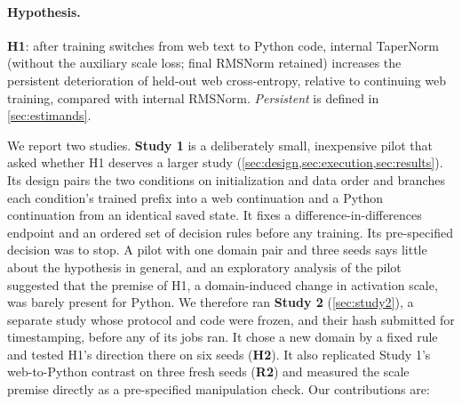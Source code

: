 \documentclass[11pt]{article}
\begin{document}
\paragraph{Hypothesis.} \textbf{H1}: after training switches from web text to Python code, internal TaperNorm
(without the auxiliary scale loss; final RMSNorm retained) increases the persistent deterioration of held-out web
cross-entropy, relative to continuing web training, compared with internal RMSNorm. \emph{Persistent} is defined
in \cref{sec:estimands}.

We report two studies. \textbf{Study 1} is a deliberately small, inexpensive pilot that asked whether H1
deserves a larger study (\cref{sec:design,sec:execution,sec:results}). Its design pairs the two conditions on
initialization and data order and branches each condition's trained prefix into a web continuation and a Python
continuation from an identical saved state. It fixes a difference-in-differences endpoint and an ordered set of
decision rules before any training. Its pre-specified decision was to stop. A pilot with one domain pair and
three seeds says little about the hypothesis in general, and an exploratory analysis of the pilot suggested that
the premise of H1, a domain-induced change in activation scale, was barely present for Python. We therefore ran
\textbf{Study 2} (\cref{sec:study2}), a separate study whose protocol and code were frozen, and their hash submitted
for timestamping, before any of its jobs ran. It chose a new domain by a fixed rule and tested H1's direction there on six seeds
(\textbf{H2}). It also replicated Study 1's web-to-Python contrast on three fresh seeds (\textbf{R2}) and measured
the scale premise directly as a pre-specified manipulation check. Our contributions are:
\end{document}
